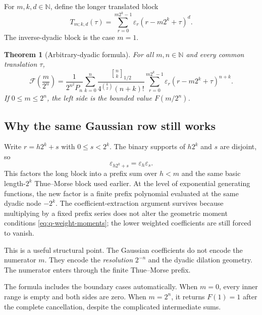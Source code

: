 \documentclass[11pt]{article}
\newtheorem{theorem}{Theorem}[section]
\theoremstyle{definition}
\newcommand{\N}{\mathbb{N}}
\newcommand{\Fabius}{F}
\newcommand{\eps}{\varepsilon}
\newcommand{\Qbin}[3]{\genfrac{[}{]}{0pt}{}{#1}{#2}_{#3}}
\begin{document}
For $m,k,d\in\N$, define the longer translated block
\begin{equation}
  T_{m;k,d}(\tau)
  =\sum_{r=0}^{m2^k-1}\eps_r
    (r-m2^k+\tau)^d.
  \label{eq:long-block}
\end{equation}
The inverse-dyadic block is the case $m=1$.

\begin{theorem}[Arbitrary-dyadic formula]
For all $m,n\in\N$ and every common translation $\tau$,
\begin{equation}
\boxed{
  \mathcal F\!\left(\frac{m}{2^n}\right)
  =\frac{1}{2^{n^2}P_n}
    \sum_{k=0}^{n}
    \frac{\Qbin{n}{k}{1/2}}
         {4^{\binom{k}{2}}(n+k)!}
    \sum_{r=0}^{m2^k-1}
      \eps_r(r-m2^k+\tau)^{n+k}.}
  \label{eq:arbitrary-dyadic-formula}
\end{equation}
If $0\le m\le2^n$, the left side is the bounded value $\Fabius(m/2^n)$.
\end{theorem}

\subsection{Why the same Gaussian row still works}

Write $r=h2^k+s$ with $0\le s<2^k$.  The binary supports of $h2^k$ and $s$ are disjoint, so
\begin{equation}
  \eps_{h2^k+s}=\eps_h\eps_s.
  \label{eq:tm-block-factor}
\end{equation}
This factors the long block into a prefix sum over $h<m$ and the same basic length-$2^k$ Thue--Morse block used earlier.  At the level of exponential generating functions, the new factor is a finite prefix polynomial evaluated at the same dyadic node $-2^k$.  The coefficient-extraction argument survives because multiplying by a fixed prefix series does not alter the geometric moment conditions \cref{eq:q-weight-moments}; the lower weighted coefficients are still forced to vanish.

This is a useful structural point.  The Gaussian coefficients do not encode the numerator $m$.  They encode the \emph{resolution} $2^{-n}$ and the dyadic dilation geometry.  The numerator enters through the finite Thue--Morse prefix.

The formula includes the boundary cases automatically.  When $m=0$, every inner range is empty and both sides are zero.  When $m=2^n$, it returns $\Fabius(1)=1$ after the complete cancellation, despite the complicated intermediate sums.
\end{document}
